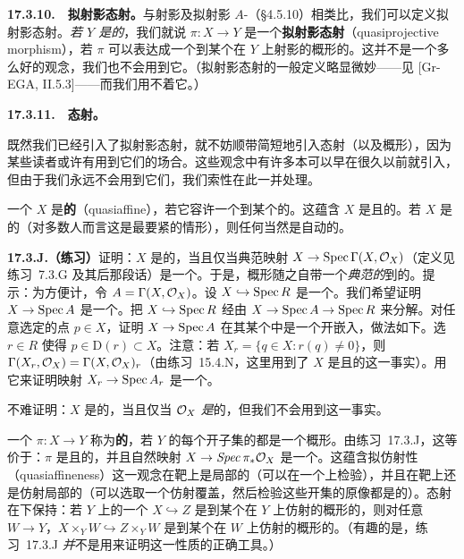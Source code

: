 \textbf{17.3.10.}\ \extrahard\ \textbf{拟射影态射。}\quad 与射影及拟射影 $A$-\trScheme（\S4.5.10）相类比，我们可以定义拟射影态射。\emph{若 $Y$ 是\trQuasicompact{}的}，我们就说 $\pi\colon X\to Y$ 是一个\textbf{拟射影态射}（quasiprojective morphism），若 $\pi$ 可以表达成一个到某个在 $Y$ 上射影的概形的\trQuasicompact\trOpenEmbedding。这并不是一个多么好的观念，我们也不会用到它。（拟射影态射的一般定义略显微妙——见 [Gr-EGA, II.5.3]——而我们用不着它。）

\textbf{17.3.11.}\ \extrahard\ \textbf{\trQuasiaffine{}态射。}

既然我们已经引入了拟射影态射，就不妨顺带简短地引入\trQuasiaffine{}态射（以及\trQuasiaffine{}概形），因为某些读者或许有用到它们的场合。这些观念中有许多本可以早在很久以前就引入，但由于我们永远不会用到它们，我们索性在此一并处理。

一个\trScheme{} $X$ 是\textbf{\trQuasiaffine{}的}（quasiaffine），若它容许一个到某个\trAffineScheme{}的\trQuasicompact\trOpenEmbedding。这蕴含 $X$ 是\trQuasicompact{}且\trSeparated{}的。若 $X$ 是\trNoetherian{}的（对多数人而言这是最要紧的情形），则任何\trOpenEmbedding{}当然是自动\trQuasicompact{}的。

\textbf{17.3.J.（练习）}\quad 证明：$X$ 是\trQuasiaffine{}的，当且仅当典范映射 $X\to\operatorname{Spec}\Gamma(X,\mathcal{O}_X)$（定义见\mbox{练习~7.3.G} 及其后那段话）是一个\trQuasicompact\trOpenEmbedding。于是，\trQuasiaffine{}概形随之自带一个\emph{典范的}到\trAffineScheme{}的\trQuasicompact\trOpenEmbedding。提示：为方便计，令 $A=\Gamma(X,\mathcal{O}_X)$。设 $X\hookrightarrow\operatorname{Spec} R$ 是一个\trQuasicompact\trOpenEmbedding。我们希望证明 $X\to\operatorname{Spec} A$ 是一个\trQuasicompact\trOpenEmbedding。把 $X\hookrightarrow\operatorname{Spec} R$ 经由 $X\to\operatorname{Spec} A\to\operatorname{Spec} R$ 来分解。对任意选定的点 $p\in X$，证明 $X\to\operatorname{Spec} A$ 在其某个\trOpen\trNeighborhood{}中是一个开嵌入，做法如下。选 $r\in R$ 使得 $p\in\mathrm{D}(r)\subset X$。注意：若 $X_r=\{q\in X: r(q)\neq 0\}$，则 $\Gamma(X_r,\mathcal{O}_X)=\Gamma(X,\mathcal{O}_X)_r$（由\mbox{练习~15.4.N}，这里用到了 $X$ 是\trQuasicompact{}且\trQuasiSeparated{}的这一事实）。用它来证明映射 $X_r\to\operatorname{Spec} A_r$ 是一个\trIsomorphism。

不难证明：\emph{$X$} 是\trQuasiaffine{}的，当且仅当 $\mathcal{O}_X$ \emph{是}\trAmple{}的，但我们不会用到这一事实。

一个\trMorphism{} $\pi\colon X\to Y$ 称为\textbf{\trQuasiaffine{}的}，若 $Y$ 的每个\trAffine{}开子集的\trInverseImage{}都是一个\trQuasiaffine{}概形。由\mbox{练习~17.3.J}，这等价于：$\pi$ 是\trQuasicompact{}且\trSeparated{}的，并且自然映射 $X\to\mathit{Spec}\,\pi_*\mathcal{O}_X$ 是一个\trQuasicompact\trOpenEmbedding。这蕴含拟仿射性（quasiaffineness）这一观念在靶上是局部的（可以在一个\trOpenCover{}上检验），并且在靶上还是仿射局部的（可以选取一个仿射覆盖，然后检验这些开集的原像都是\trQuasiaffine{}的）。\trQuasiaffine{}态射在\trBaseChange{}下保持：若 $Y$ 上的一个\trMorphism{} $X\hookrightarrow Z$ 是到某个在 $Y$ 上仿射的概形的\trQuasicompact\trOpenEmbedding，则对任意 $W\to Y$，$X\times_Y W\hookrightarrow Z\times_Y W$ 是到某个在 $W$ 上仿射的概形的\trQuasicompact\trOpenEmbedding。（有趣的是，\mbox{练习~17.3.J} \emph{并}不是用来证明这一\trBaseChange{}性质的正确工具。）


